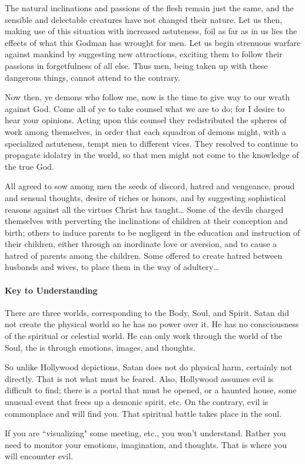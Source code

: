 \begin{quotex}
The natural inclinations and passions of the flesh remain just the same, and the sensible and delectable creatures have not changed their nature. Let us then, making use of this situation with increased astuteness, foil as far as in us lies the effects of what this Godman has wrought for men. Let us begin strenuous warfare against mankind by suggesting new attractions, exciting them to follow their passions in forgetfulness of all else. Thus men, being taken up with these dangerous things, cannot attend to the contrary.

Now then, ye demons who follow me, now is the time to give way to our wrath against God. Come all of ye to take counsel what we are to do; for I desire to hear your opinions. Acting upon this counsel they redistributed the spheres of work among themselves, in order that each squadron of demons might, with a specialized astuteness, tempt men to different vices. They resolved to continue to propagate idolatry in the world, so that men might not come to the knowledge of the true God.

All agreed to sow among men the seeds of discord, hatred and vengeance, proud and sensual thoughts, desire of riches or honors, and by suggesting sophistical reasons against all the virtues Christ has taught… Some of the devils charged themselves with perverting the inclinations of children at their conception and birth; others to induce parents to be negligent in the education and instruction of their children, either through an inordinate love or aversion, and to cause a hatred of parents among the children. Some offered to create hatred between husbands and wives, to place them in the way of adultery… 

\end{quotex}
\paragraph{Key to Understanding}
There are three worlds, corresponding to the Body, Soul, and Spirit. Satan did not create the physical world so he has no power over it. He has no consciousness of the spiritual or celestial world. He can only work through the world of the Soul, the is through emotions, images, and thoughts.

So unlike Hollywood depictions, Satan does not do physical harm, certainly not directly. That is not what must be feared. Also, Hollywood assumes evil is difficult to find; there is a portal that must be opened, or a haunted house, some unusual event that frees up a demonic spirit, etc. On the contrary, evil is commonplace and will find you. That spiritual battle takes place in the soul.

If you are ``visualizing" some meeting, etc., you won't understand. Rather you need to monitor your emotions, imagination, and thoughts. That is where you will encounter evil.



